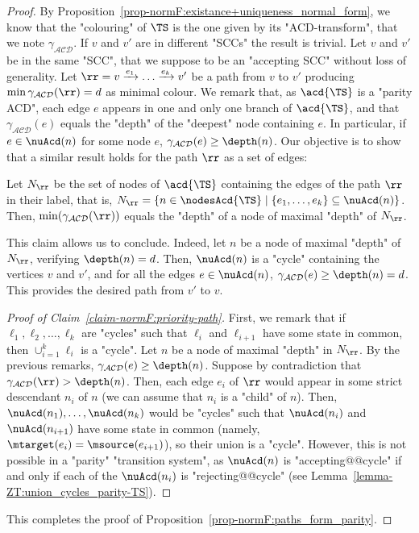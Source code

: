 \documentclass[10pt,a4paper]{amsart}
\newenvironment{subproof}[1][Proof]{\begin{proof}[#1]\renewcommand{\qedsymbol}{$\blacksquare$}}{\end{proof}}
\renewcommand{\gg}{\gamma}
\newcommand{\re}[1]{\xrightarrow{#1}}
\newcommand\acdNoP{\mathcal{ACD}}
\begin{document}
\begin{proof}
	By Proposition~\ref{prop-normF:existance+uniqueness_normal_form}, we know that the "colouring" of $\TS$ is the one given by its "ACD-transform", that we note $\gg_{\acdNoP}$. 
	If $v$ and $v'$ are in different "SCCs" the result is trivial.  
	Let $v$ and $v'$ be in the same "SCC", that we suppose to be an "accepting SCC" without loss of generality. %
	Let $\rr = v\re{e_1}\dots \re{e_k} v'$ be a path from $v$ to $v'$ producing $\min \gg_{\acdNoP}(\rr) = d$ as minimal colour.
	We remark that, as $\acd{\TS}$ is a "parity ACD", each edge $e$ appears in one and only one branch of $\acd{\TS}$, and that $\gg_{\acdNoP}(e)$ equals the "depth" of the "deepest" node containing $e$. In particular, if $e\in\nuAcd(n)$ for some node $e$, $\gg_{\acdNoP}(e)\geq \depth(n)$. Our objective is to show that a similar result holds for the path $\rr$ as a set of edges:
	\begin{claim}\label{claim-normF:priority-path}
		Let $N_{\rr}$ be the set of nodes of $\acd{\TS}$ containing the edges of the path $\rr$ in their label, that is, $N_{\rr} = \{n\in \nodesAcd{\TS} \mid \{e_1,\dots, e_k\}\subseteq \nuAcd(n)\}$.
		Then, $\min (\gg_{\acdNoP}(\rr))$ equals the "depth" of a node of maximal "depth" of $N_\rr$.\footnotemark{}
	\end{claim}
	This claim allows us to conclude. Indeed, let $n$ be a node of maximal "depth" of $N_\rr$, verifying $\depth(n)=d$. Then, $\nuAcd(n)$ is a "cycle" containing the vertices $v$ and $v'$, and for all the edges $e\in \nuAcd(n)$, $\gg_{\acdNoP}(e)\geq \depth(n)=d$. This provides the desired path from $v'$ to $v$.
	
	\begin{subproof}[Proof of Claim~\ref{claim-normF:priority-path}]
		First, we remark that if $\ell_1, \ell_2,\dots, \ell_k$ are "cycles" such that $\ell_i$ and $\ell_{i+1}$ have some state in common, then $\cup_{i=1}^k \ell_i$ is a "cycle". Let $n$ be a node of maximal "depth" in $N_\rr$. By the previous remarks, $\gg_{\acdNoP}(e)\geq \depth(n)$. Suppose by contradiction that $\gg_{\acdNoP}(\rr)> \depth(n)$. Then, each edge $e_i$ of $\rr$ would appear in some strict descendant $n_i$ of $n$ (we can assume that $n_i$ is a "child" of $n$). Then, $\nuAcd(n_1), \dots, \nuAcd(n_k)$ would be "cycles" such that $\nuAcd(n_i)$ and $\nuAcd(n_{i+1})$ have some state in common (namely, $\mtarget(e_i) = \msource(e_{i+1})$), so their union is a "cycle". However, this is not possible in a "parity" "transition system", as $\nuAcd(n)$ is "accepting@@cycle" if and only if each of the $\nuAcd(n_i)$ is "rejecting@@cycle" (see Lemma~\ref{lemma-ZT:union_cycles_parity-TS}).
	\end{subproof} 
  This completes the proof of Proposition~\ref{prop-normF:paths_form_parity}.
\end{proof}
\end{document}
